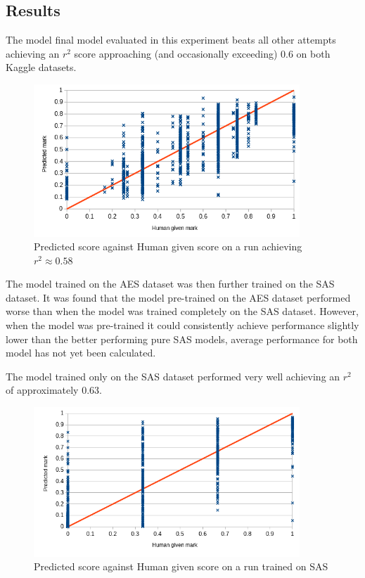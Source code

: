 \documentclass[11pt]{article}
\begin{document}
\subsection{Results}
\label{sec:orgf63d5f8}
The model final model evaluated in this experiment beats all other attempts achieving an \(r^2\) score approaching (and occasionally exceeding) \(0.6\) on both Kaggle datasets.

\begin{figure}[htbp]
\centering
\includegraphics[width=10cm]{./exp5_aes_dist.png}
\caption{Predicted score against Human given score on a run achieving \(r^2 \approx 0.58\)}
\end{figure}

The model trained on the AES dataset was then further trained on the SAS dataset. It was found that the model pre-trained on the AES dataset performed worse than when the model was trained completely on the SAS dataset. However, when the model was pre-trained it could consistently achieve performance slightly lower than the better performing pure SAS models, average performance for both model has not yet been calculated.

The model trained only on the SAS dataset performed very well achieving an \(r^2\) of approximately 0.63.

\begin{figure}[htbp]
\centering
\includegraphics[width=10cm]{./exp5_sas_dist.png}
\caption{Predicted score against Human given score on a run trained on SAS}
\end{figure}
\end{document}
